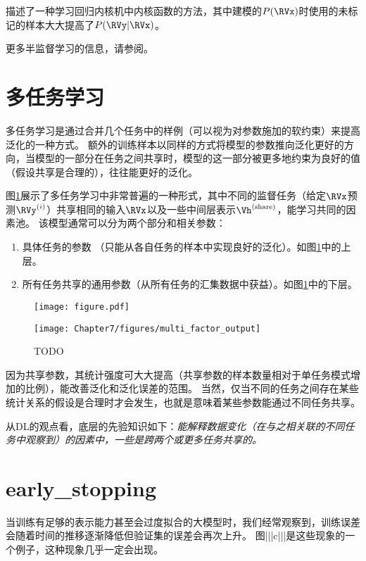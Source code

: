 \cite{Russ+Geoff-nips-2007}描述了一种学习回归内核机中内核函数的方法，其中建模的$P(\RVx)$时使用的未标记的样本大大提高了$P(\RVy | \RVx)$。

更多半监督学习的信息，请参阅\cite{SSL-Book-2006}。

\section{多任务学习}
\label{sec:multitask_learning}
多任务学习\citep{caruana93a}是通过合并几个任务中的样例（可以视为对参数施加的软约束）来提高泛化的一种方式。
额外的训练样本以同样的方式将模型的参数推向泛化更好的方向，当模型的一部分在任务之间共享时，模型的这一部分被更多地约束为良好的值（假设共享是合理的），往往能更好的泛化。

图\ref{fig:chap7_multi_factor_output}展示了多任务学习中非常普遍的一种形式，其中不同的监督任务（给定$\RVx$预测$\RVy^{(i)}$）共享相同的输入$\RVx$以及一些中间层表示$\Vh^{(\text{share})}$，能学习共同的因素池。
该模型通常可以分为两个部分和相关参数：
\begin{enumerate}
 \item 具体任务的参数 （只能从各自任务的样本中实现良好的泛化）。如图\ref{fig:chap7_multi_factor_output}中的上层。
 \item 所有任务共享的通用参数（从所有任务的汇集数据中获益）。如图\ref{fig:chap7_multi_factor_output}中的下层。
\end{enumerate}
\begin{figure}[!htb]
\ifOpenSource
\centerline{\texttt{[image: figure.pdf]}}
\else
\centerline{\texttt{[image: Chapter7/figures/multi\_factor\_output]}}
\fi
\caption{TODO}
\label{fig:chap7_multi_factor_output}
\end{figure}

因为共享参数，其统计强度可大大提高（共享参数的样本数量相对于单任务模式增加的比例），能改善泛化和泛化误差的范围\citep{baxter95a}。
当然，仅当不同的任务之间存在某些统计关系的假设是合理时才会发生，也就是意味着某些参数能通过不同任务共享。

从\gls{DL}的观点看，底层的先验知识如下：\emph{能解释数据变化（在与之相关联的不同任务中观察到）的因素中，一些是跨两个或更多任务共享的。}


\section{\gls{early_stopping}}
\label{sec:early_stopping}
当训练有足够的表示能力甚至会过度拟合的大模型时，我们经常观察到，训练误差会随着时间的推移逐渐降低但验证集的误差会再次上升。
图|||c|||是这些现象的一个例子，这种现象几乎一定会出现。


